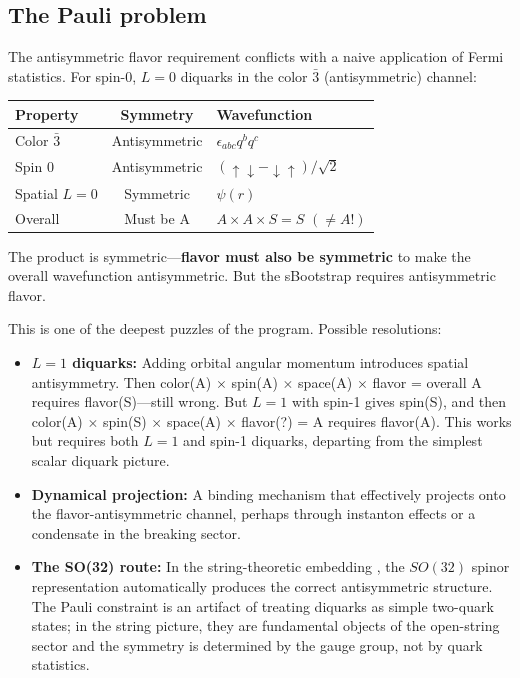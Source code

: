 \documentclass[12pt,a4paper]{article}
\begin{document}
\subsection{The Pauli problem}

The antisymmetric flavor requirement conflicts with a naive 
application of Fermi statistics. For spin-0, $L=0$ diquarks in 
the color $\bar{3}$ (antisymmetric) channel:

\begin{center}
\begin{tabular}{lcl}
\toprule
Property & Symmetry & Wavefunction \\
\midrule
Color $\bar{3}$ & Antisymmetric & $\epsilon_{abc} q^b q^c$ \\
Spin 0 & Antisymmetric & $(\uparrow\downarrow - \downarrow\uparrow)/\sqrt{2}$ \\
Spatial $L=0$ & Symmetric & $\psi(r)$ \\
\midrule
Overall & Must be A & $A \times A \times S = S$ \quad$(\neq A!)$ \\
\bottomrule
\end{tabular}
\end{center}

The product is symmetric---\textbf{flavor must also be symmetric} 
to make the overall wavefunction antisymmetric. But the sBootstrap 
requires antisymmetric flavor.

This is one of the deepest puzzles of the program. Possible 
resolutions:
\begin{itemize}
\item \textbf{$L = 1$ diquarks:} Adding orbital angular momentum 
introduces spatial antisymmetry. Then color(A) $\times$ spin(A) 
$\times$ space(A) $\times$ flavor = overall A requires 
flavor(S)---still wrong. But $L=1$ with spin-1 gives spin(S), 
and then color(A) $\times$ spin(S) $\times$ space(A) $\times$ 
flavor(?) = A requires flavor(A). This works but requires both 
$L=1$ and spin-1 diquarks, departing from the simplest scalar 
diquark picture.
\item \textbf{Dynamical projection:} A binding mechanism that 
effectively projects onto the flavor-antisymmetric channel, perhaps 
through instanton effects or a condensate in the breaking sector.
\item \textbf{The SO(32) route:} In the string-theoretic embedding 
\cite{Rivero2005}, the $SO(32)$ spinor representation automatically 
produces the correct antisymmetric structure. The Pauli constraint 
is an artifact of treating diquarks as simple two-quark states; in 
the string picture, they are fundamental objects of the open-string 
sector and the symmetry is determined by the gauge group, not by 
quark statistics.
\end{itemize}
\end{document}
